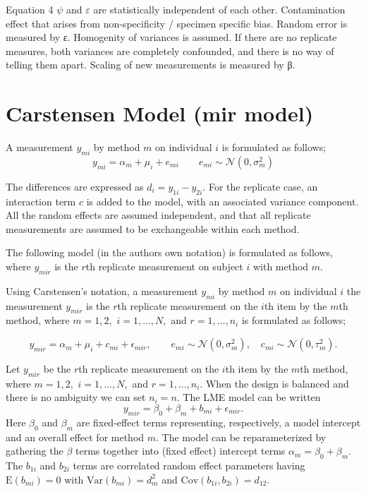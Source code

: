 \documentclass[12pt, a4paper]{report}
\theoremstyle{plain}
\theoremstyle{definition}
\theoremstyle{remark}
\begin{document}
Equation 4 
$\psi$  and $\varepsilon$ are statistically independent of each other.
Contamination effect that arises from non-specificity /  specimen specific bias.
Random error is measured by ε. Homogenity of variances is assumed.
If there are no replicate measures,  both variances are completely confounded, and there is no way of telling them apart.
Scaling of new measurements is measured by β.


\section{Carstensen Model (mir model)}

A measurement $y_{mi}$ by method $m$ on individual $i$ is formulated as follows;
\begin{equation}
y_{mi}  = \alpha_{m} + \mu_{i} + e_{mi} \qquad  e_{mi} \sim
\mathcal{N}(0,\sigma^{2}_{m})
\end{equation}

The differences are expressed as $d_{i} = y_{1i} - y_{2i}$. For the replicate case, an interaction term $c$ is added to the model, with an associated variance component. All the random effects are assumed independent, and that all replicate measurements are assumed to be exchangeable within each method.


The following model (in the authors own notation) is
formulated as follows, where $y_{mir}$ is the $r$th replicate measurement on subject $i$ with method $m$.


Using Carstensen's notation, a measurement $y_{mi}$ by method $m$ on individual $i$ the measurement $y_{mir} $ is the $r$th replicate measurement on the $i$th item by the $m$th method, where $m=1,2,$ $i=1,\ldots,N,$ and $r = 1,\ldots,n_i$ is formulated as follows;

\begin{equation}
y_{mir}  = \alpha_{m} + \mu_{i} + c_{mi} + \epsilon_{mir}, \qquad  e_{mi}
\sim \mathcal{N}(0,\sigma^{2}_{m}), \quad c_{mi} \sim \mathcal{N}(0,\tau^{2}_{m}).
\end{equation}

Let $y_{mir} $ be the $r$th replicate measurement on the $i$th item by the $m$th method, where $m=1,2,$ $i=1,\ldots,N,$ and $r = 1,\ldots,n_i.$ When the design is balanced and there is no ambiguity we can set $n_i=n.$ The LME model can be written
\begin{equation}
y_{mir} = \beta_{0} + \beta_{m} + b_{mi} + \epsilon_{mir}.
\end{equation}
Here $\beta_0$ and $\beta_m$ are fixed-effect terms representing, respectively, a model intercept and an overall effect for method $m.$ The model can be reparameterized by gathering the $\beta$ terms together into (fixed effect) intercept terms $\alpha_m=\beta_0+\beta_m.$ The $b_{1i}$ and $b_{2i}$ terms are correlated random effect parameters having $\mathrm{E}(b_{mi})=0$ with $\mathrm{Var}(b_{mi})=d^2_m$ and $\mathrm{Cov}(b_{1i}, b_{2 i})=d_{12}.$ 
\end{document}

